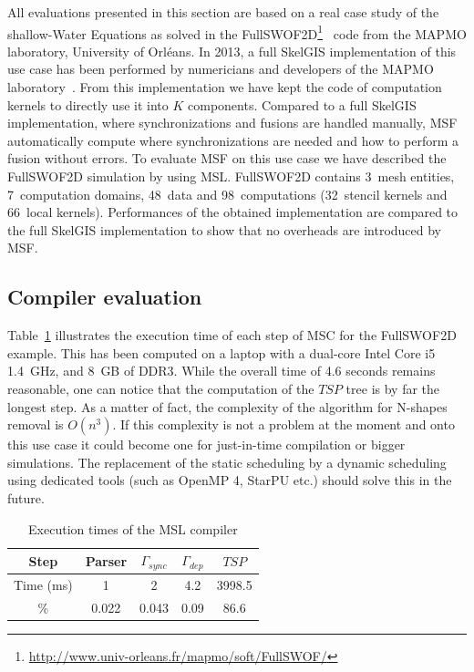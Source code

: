 All evaluations presented in this section are based on a real case study of the shallow-Water Equations as solved in the FullSWOF2D\footnote{\url{http://www.univ-orleans.fr/mapmo/soft/FullSWOF/}}~\cite{Ferrari2004,CPE:CPE3494} code from the MAPMO laboratory, University of Orl\'eans.
In 2013, a full SkelGIS implementation of this use case has been performed by numericians and developers of the MAPMO laboratory~\cite{CPE:CPE3494,cordier2013fullswof,coullon:hal-00832660}. From this implementation we have kept the code of computation kernels to directly use it into $K$ components. Compared to a full SkelGIS implementation, where synchronizations and fusions are handled manually, MSF automatically compute where synchronizations are needed and how to perform a fusion without errors. To evaluate MSF on this use case we have described the FullSWOF2D simulation by using MSL. FullSWOF2D contains 3~mesh entities, 7~computation domains, 48~data and 98~computations (32~stencil kernels and 66~local kernels). Performances of the obtained implementation are compared to the full SkelGIS implementation to show that no overheads are introduced by MSF.

\subsection{Compiler evaluation}

Table~\ref{fig:exectime} illustrates the execution time of each step of MSC for the FullSWOF2D example.
This has been computed on a laptop with a dual-core Intel Core i5 1.4~GHz, and 8~GB of DDR3.
While the overall time of 4.6 seconds remains reasonable, one can notice that the computation of the $TSP$ tree is by far the longest step.
As a matter of fact, the complexity of the algorithm for N-shapes removal is $O(n^3)$.
If this complexity is not a problem at the moment and onto this use case it could become one for just-in-time compilation or bigger simulations. The replacement of the static scheduling by a dynamic scheduling using dedicated tools (such as OpenMP 4, StarPU etc.) should solve this in the future.

\begin{table}[!h]
 \begin{center}
 \begin{tabular}{|c|c|c|c|c|}
   Step & Parser & $\Gamma_{sync}$ & $\Gamma_{dep}$ & $TSP$\\
   \hline
   Time (ms) & 1 & 2 & 4.2 & 3998.5\\
   \% & 0.022 & 0.043 & 0.09 & 86.6\\
 \end{tabular}
\caption{Execution times of the MSL compiler}
\label{fig:exectime}
 \end{center}
\end{table}

